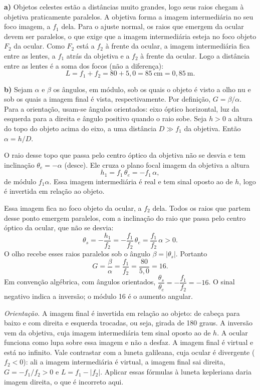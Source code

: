 \documentclass{article}%
\begin{document}
\textbf{a)} Objetos celestes estão a distâncias muito grandes, logo seus raios chegam à objetiva praticamente paralelos. A objetiva forma a imagem intermediária no seu foco imagem, a $f_1$ dela. Para o ajuste normal, os raios que emergem da ocular devem ser paralelos, o que exige que a imagem intermediária esteja no foco objeto $F_2$ da ocular. Como $F_2$ está a $f_2$ à frente da ocular, a imagem intermediária fica entre as lentes, a $f_1$ atrás da objetiva e a $f_2$ à frente da ocular. Logo a distância entre as lentes é a soma dos focos (não a diferença):
\[
L=f_1+f_2=80+5{,}0=85\ \text{cm}=0{,}85\ \text{m}.
\]

\textbf{b)} Sejam $\alpha$ e $\beta$ os ângulos, em módulo, sob os quais o objeto é visto a olho nu e sob os quais a imagem final é vista, respectivamente. Por definição, $G=\beta/\alpha$. Para a orientação, usam-se ângulos orientados: eixo óptico horizontal, luz da esquerda para a direita e ângulo positivo quando o raio sobe. Seja $h>0$ a altura do topo do objeto acima do eixo, a uma distância $D\gg f_1$ da objetiva. Então $\alpha=h/D$.

O raio desse topo que passa pelo centro óptico da objetiva não se desvia e tem inclinação $\theta_e=-\alpha$ (desce). Ele cruza o plano focal imagem da objetiva a altura
\[
h_1=f_1\,\theta_e=-f_1\,\alpha,
\]
de módulo $f_1\alpha$. Essa imagem intermediária é real e tem sinal oposto ao de $h$, logo é invertida em relação ao objeto.

Essa imagem fica no foco objeto da ocular, a $f_2$ dela. Todos os raios que partem desse ponto emergem paralelos, com a inclinação do raio que passa pelo centro óptico da ocular, que não se desvia:
\[
\theta_s=-\frac{h_1}{f_2}=-\frac{f_1}{f_2}\,\theta_e=\frac{f_1}{f_2}\,\alpha>0.
\]
O olho recebe esses raios paralelos sob o ângulo $\beta=|\theta_s|$. Portanto
\[
G=\frac{\beta}{\alpha}=\frac{f_1}{f_2}=\frac{80}{5{,}0}=16.
\]
Em convenção algébrica, com ângulos orientados, $\dfrac{\theta_s}{\theta_e}=-\dfrac{f_1}{f_2}=-16$. O sinal negativo indica a inversão; o módulo 16 é o aumento angular.

\emph{Orientação.} A imagem final é invertida em relação ao objeto: de cabeça para baixo e com direita e esquerda trocadas, ou seja, girada de 180 graus. A inversão vem da objetiva, cuja imagem intermediária tem sinal oposto ao de $h$. A ocular funciona como lupa sobre essa imagem e não a desfaz. A imagem final é virtual e está no infinito. Vale contrastar com a luneta galileana, cuja ocular é divergente ($f_2<0$): ali a imagem intermediária é virtual, a imagem final sai direita, $G=-f_1/f_2>0$ e $L=f_1-|f_2|$. Aplicar essas fórmulas à luneta kepleriana daria imagem direita, o que é incorreto aqui.
\end{document}
